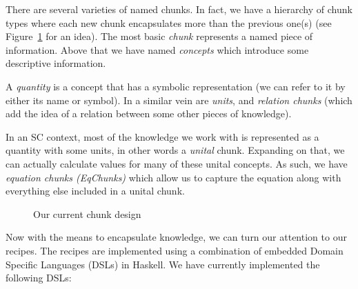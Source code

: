 \documentclass[preprint, 10pt]{sigplanconf}
\begin{document}
There are several varieties of named chunks. In fact, we have a hierarchy of
chunk types where each new chunk encapsulates more than the previous one(s) (see
Figure~\ref{fig:chunks} for an idea). The most basic \emph{chunk} represents a
named piece of information. Above that we have named \emph{concepts} which
introduce some descriptive information.

A \emph{quantity} is a concept that has a symbolic representation (we can refer
to it by either its name or symbol). In a similar vein are \emph{units}, 
and \emph{relation chunks} (which add the idea of a relation between some other
pieces of knowledge).

In an SC context, most of the knowledge we work with is represented as a
quantity with some units, in other words a \emph{unital} chunk. Expanding on
that, we can actually calculate values for many of these unital concepts. As
such, we have \emph{equation chunks (EqChunks)} which allow us to capture the
equation along with everything else included in a unital chunk.

\begin{figure}
\begin{center}
\end{center}
\caption{Our current chunk design}
\label{fig:chunks}
\end{figure}

Now with the means to encapsulate knowledge, we can turn our attention to our
recipes. The recipes are implemented using a combination of embedded Domain
Specific Languages (DSLs) in Haskell. We have currently implemented the
following DSLs:
\end{document}
